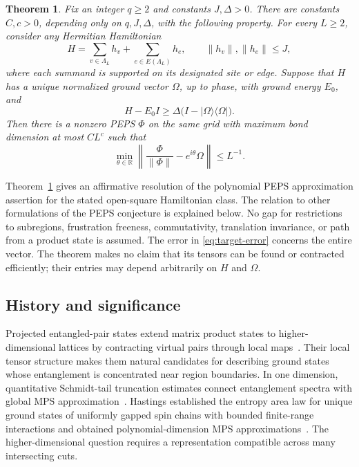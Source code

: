 \documentclass[11pt]{article}
\numberwithin{equation}{section}
\newtheorem{theorem}{Theorem}[section]
\theoremstyle{definition}
\theoremstyle{remark}
\begin{document}
\begin{theorem}\label{thm:main}
Fix an integer $q\ge2$ and constants $J,\Delta>0$. There are constants
$C,c>0$, depending only on $q,J,\Delta$, with the following property.
For every $L\ge2$, consider any Hermitian Hamiltonian
\begin{equation}\label{eq:model}
 H=\sum_{v\in\Lambda_L}h_v+\sum_{e\in E(\Lambda_L)}h_e,
 \qquad \lVert h_v\rVert,\lVert h_e\rVert\le J,
\end{equation}
where each summand is supported on its designated site or edge.
Suppose that $H$ has a unique normalized ground vector $\Omega$, up to
phase, with ground energy $E_0$, and
\begin{equation}\label{eq:global-gap}
 H-E_0I\ge\Delta\bigl(I-|\Omega\rangle\langle\Omega|\bigr).
\end{equation}
Then there is a nonzero PEPS $\Phi$ on the same grid with maximum bond
dimension at most $CL^c$ such that
\begin{equation}\label{eq:target-error}
 \min_{\theta\in\mathbb R}
 \left\|\frac{\Phi}{\lVert \Phi\rVert}-e^{i\theta}\Omega\right\|
 \le L^{-1}.
\end{equation}
\end{theorem}

Theorem~\ref{thm:main} gives an affirmative resolution of the polynomial
PEPS approximation assertion for the stated open-square Hamiltonian class.
The relation to other formulations of the PEPS conjecture is explained below. No gap for restrictions to subregions,
frustration freeness, commutativity, translation invariance, or path from a
product state is assumed. The error in \eqref{eq:target-error} concerns the
entire vector. The theorem makes no claim that its tensors can be found or
contracted efficiently; their entries may depend arbitrarily on $H$ and
$\Omega$.

\subsection{History and significance}
Projected entangled-pair states extend matrix product states to
higher-dimensional lattices by contracting virtual pairs through local
maps~\cite{VerstraeteCirac2004PEPS}. Their local tensor structure makes them
natural candidates for describing ground states whose entanglement is
concentrated near region boundaries. In one dimension, quantitative
Schmidt-tail truncation estimates connect entanglement spectra with global
MPS approximation~\cite{VerstraeteCirac2006MPS}. Hastings established the
entropy area law for unique ground states of uniformly gapped spin chains
with bounded finite-range interactions and obtained polynomial-dimension
MPS approximations~\cite{Hastings2007}. The higher-dimensional question
requires a representation compatible across many intersecting cuts.
\end{document}
